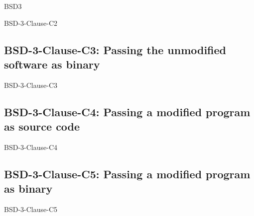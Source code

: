\begin{license}{BSD3}
\begin{lsuc}{BSD-3-Clause-C2}
  \begin{lsucprohibits}
    \lsucitem{\dontUseAuthorNames}%
  \end{lsucprohibits}
\end{lsuc}

\subsection{BSD-3-Clause-C3: Passing the unmodified software as binary}
\begin{lsuc}{BSD-3-Clause-C3}

  \lsucmeans{\useCaseThree}
  \lsuccovers{\coversThree}

  \begin{lsucrequires}  
    \lsucmandatory{\insertLicenseIntoBinary}\passingFilesCorrectly
  \end{lsucrequires}

  \begin{lsucprohibits}
    \lsucitem{\dontUseAuthorNames}%
  \end{lsucprohibits}
\end{lsuc}

\subsection{BSD-3-Clause-C4: Passing a modified program as source code}
\begin{lsuc}{BSD-3-Clause-C4}

  \lsucmeans{\useCaseFour}
  \lsuccovers{\coversFour}

  \begin{lsucrequires}
    \lsucmandatory{\keepLicenseElements}
    \lsucoptional{\addLicenseToCopyrightMessage}
  \end{lsucrequires}

  \begin{lsucprohibits}
    \lsucitem{\dontUseAuthorNames}%
  \end{lsucprohibits}
\end{lsuc}

\subsection{BSD-3-Clause-C5: Passing a modified program as binary}
\begin{lsuc}{BSD-3-Clause-C5}


\end{lsuc}
\end{license}
